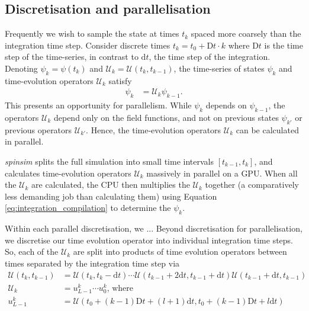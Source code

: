 \documentclass{jors}
\begin{document}
	\subsection{Discretisation and parallelisation}
		Frequently we wish to sample the state at times \(t_k\) spaced more coarsely than the integration time step.
		Consider discrete times \(t_k = t_0 + \mathrm{D}t\cdot k\) where \(\mathrm{D}t\) is the time step of the time-series, in contrast to \(\mathrm{d}t\), the time step of the integration.
		Denoting \(\psi_k = \psi(t_k)\) and \(\mathcal{U}_k = \mathcal{U}(t_{k}, t_{k-1})\), the time-series of states \( \psi_k\) and time-evolution operators \(\mathcal{U}_k\) satisfy
		\begin{align}
			\psi_k &= \mathcal{U}_k\psi_{k-1}.\label{eq:integration_compilation}
		\end{align}
		This presents an opportunity for parallelism.
		While \(\psi_k\) depends on \(\psi_{k-1}\), the operators \(\mathcal{U}_k\) depend only on the field functions, and not on previous states \(\psi_{k'}\) or previous operators \(\mathcal{U}_{k'}\).
		Hence, the time-evolution operators \(\mathcal{U}_k\) can be calculated in parallel.

		\emph{spinsim} splits the full simulation into small time intervals \([t_{k - 1}, t_{k}]\), and calculates time-evolution operators \(\mathcal{U}_k\) massively in parallel on a GPU.
		When all the \(\mathcal{U}_k\) are calculated, the CPU then multiplies the \(\mathcal{U}_k\) together (a comparatively less demanding job than calculating them) using Equation \eqref{eq:integration_compilation} to determine the \(\psi_k\).

		Within each parallel discretisation, we ...
		Beyond discretisation for parallelisation, we discretise our time evolution operator into individual integration time steps.
		So, each of the \(\mathcal{U}_k\) are split into products of time evolution operators between times separated by the integration time step via
		\begin{align}
			\mathcal{U}(t_k, t_{k-1}) &= \mathcal{U}(t_k, t_k - \mathrm{d}t) \cdots \mathcal{U}(t_{k-1} + 2\mathrm{d}t, t_{k-1} + \mathrm{d}t) \mathcal{U}(t_{k-1} + \mathrm{d}t, t_{k-1})\\
			\mathcal{U}_k &= u^k_{L-1} \cdots u^k_0\textrm{, where}\\
			u^k_{L-1} &= \mathcal{U}(t_0 + (k - 1)\mathrm{D}t + (l + 1)\mathrm{d}t, t_0 + (k - 1)\mathrm{D}t + l\mathrm{d}t)
		\end{align}
\end{document}
